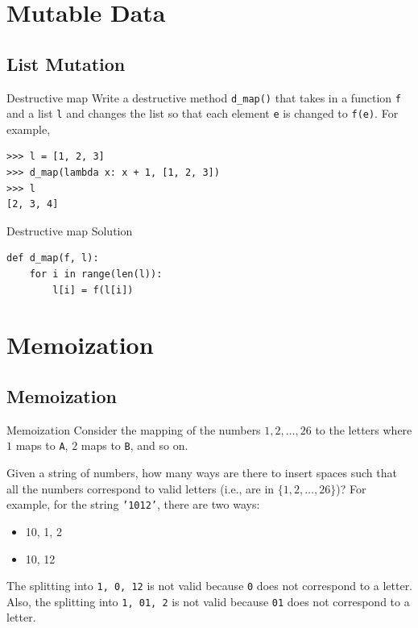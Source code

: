 \documentclass[9pt]{beamer}
\begin{document}
\section{Mutable Data}
\subsection{List Mutation}

\begin{frame}[fragile]{Destructive map}
  Write a destructive method {\tt d\_map()} that takes in a function {\tt f}
  and a list {\tt l} and changes the list so that each element {\tt e} is
  changed to {\tt f(e)}. For example,

  \begin{lstlisting}
>>> l = [1, 2, 3]
>>> d_map(lambda x: x + 1, [1, 2, 3])
>>> l
[2, 3, 4]
  \end{lstlisting}
\end{frame}

\begin{frame}[fragile]{Destructive map}
  Solution

  \begin{lstlisting}
def d_map(f, l):
    for i in range(len(l)):
        l[i] = f(l[i])
  \end{lstlisting}

\end{frame}

\section{Memoization}
\subsection{Memoization}

\begin{frame}[fragile]{Memoization}
  Consider the mapping of the numbers $1, 2, \dots, 26$ to the letters where
  $1$ maps to {\tt A}, $2$ maps to {\tt B}, and so on.

  Given a string of numbers, how many ways are there to insert spaces such
  that all the numbers correspond to valid letters (i.e., are in $\{1, 2,
  \dots, 26\}$)? For example, for the string {\tt '1012'}, there are two
  ways:

  \begin{itemize}
    \item
      10, 1, 2
    \item
      10, 12
  \end{itemize}

  The splitting into {\tt 1, 0, 12} is not valid because {\tt 0} does not
  correspond to a letter. Also, the splitting into {\tt 1, 01, 2} is not
  valid because {\tt 01} does not correspond to a letter.
\end{frame}
\end{document}

